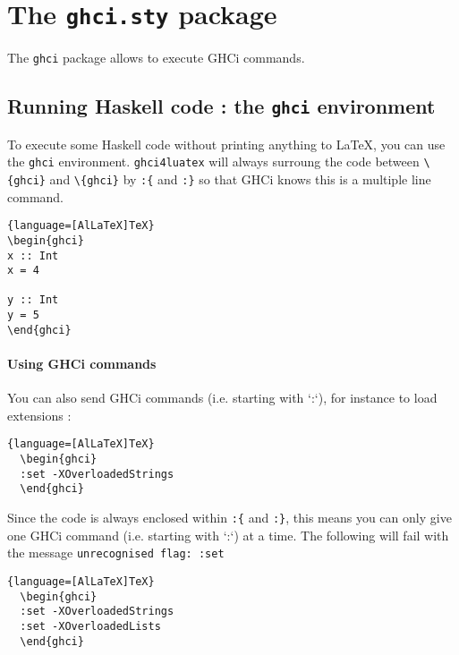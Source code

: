 \documentclass{article}
\begin{document}
\section{The \texttt{ghci.sty} package}

The \texttt{ghci} package allows to execute GHCi commands.

\subsection{Running Haskell code : the \texttt{ghci} environment}

To execute some Haskell code without printing anything to LaTeX, you can use the \texttt{ghci} environment. \texttt{ghci4luatex} will always surroung the code between \texttt{\textbackslash {}\{ghci\}} and  \texttt{\textbackslash {}\{ghci\}} by \texttt{:\{} and \texttt{:\}} so that GHCi knows this is a multiple line command.

\begin{latexbox}
\begin{lstlisting}{language=[AlLaTeX]TeX}
\begin{ghci}
x :: Int
x = 4

y :: Int
y = 5
\end{ghci}
\end{lstlisting}
\end{latexbox}

\paragraph{Using GHCi commands} You can also send GHCi commands (i.e. starting with `:`), for instance to load extensions :

  \begin{lstlisting}{language=[AlLaTeX]TeX}
  \begin{ghci}
  :set -XOverloadedStrings
  \end{ghci}
  \end{lstlisting}

\begin{warningbox}
  Since the code is always enclosed within \texttt{:\{} and \texttt{:\}}, this means you can only give one GHCi command (i.e. starting with `:`) at a time. The following will fail with the message \texttt{unrecognised flag: :set}
  \begin{lstlisting}{language=[AlLaTeX]TeX}
  \begin{ghci}
  :set -XOverloadedStrings
  :set -XOverloadedLists
  \end{ghci}
  \end{lstlisting}
\end{warningbox}
\end{document}
